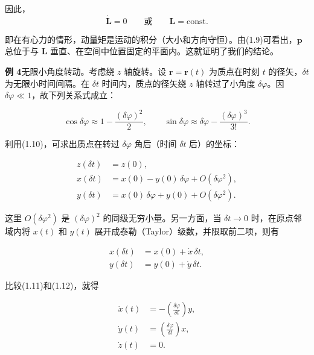 \documentclass[11pt,a4paper,oneside]{ctexbook}
\newcommand{\ve}[1]{\bm{#1}}
\begin{document}
因此，
\begin{equation*}
\dot{\ve{L}} = 0 \qquad \text{或} \qquad \ve{L} = \mathrm{const}.
\end{equation*}

即在有心力的情形，动量矩是运动的积分（大小和方向守恒）。由(1.9)可看出，$\ve{p}$ 总位于与 $\ve{L}$ 垂直、在空间中位置固定的平面内。这就证明了我们的结论。

\textbf{例 4}\quad 无限小角度转动。考虑绕 $z$ 轴旋转。设 $\ve{r} = \ve{r}(t)$ 为质点在时刻 $t$ 的径矢，$\delta t$ 为无限小时间间隔。在 $\delta t$ 时间内，质点的径矢绕 $z$ 轴转过了小角度 $\delta\varphi$。因 $\delta\varphi \ll 1$，故下列关系式成立：

\begin{equation}
\cos\delta\varphi \approx 1 - \frac{(\delta\varphi)^{2}}{2}, \qquad
\sin\delta\varphi \approx \delta\varphi - \frac{(\delta\varphi)^{3}}{3!}.
\tag{1.10}
\end{equation}

利用(1.10)，可求出质点在转过 $\delta\varphi$ 角后（时间 $\delta t$ 后）的坐标：

\begin{equation}
\begin{aligned}
z(\delta t) &= z(0),\\
x(\delta t) &= x(0) - y(0)\,\delta\varphi + O(\delta\varphi^{2}),\\
y(\delta t) &= x(0)\,\delta\varphi + y(0) + O(\delta\varphi^{2}).
\end{aligned}
\tag{1.11}
\end{equation}

这里 $O(\delta\varphi^{2})$ 是 $(\delta\varphi)^{2}$ 的同级无穷小量。另一方面，当 $\delta t \to 0$ 时，在原点邻域内将 $x(t)$ 和 $y(t)$ 展开成泰勒（Taylor）级数，并限取前二项，则有

\begin{equation}
\begin{aligned}
x(\delta t) &= x(0) + \dot{x}\,\delta t,\\
y(\delta t) &= y(0) + \dot{y}\,\delta t.
\end{aligned}
\tag{1.12}
\end{equation}

比较(1.11)和(1.12)，就得

\begin{equation*}
\begin{aligned}
\dot{x}(t) &= -\left(\frac{\delta\varphi}{\delta t}\right) y,\\
\dot{y}(t) &= \left(\frac{\delta\varphi}{\delta t}\right) x,\\
\dot{z}(t) &= 0.
\end{aligned}
\end{equation*}
\end{document}
